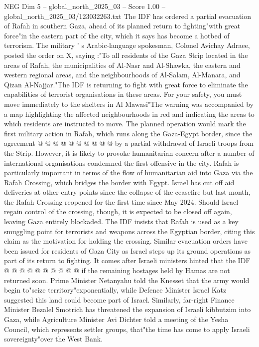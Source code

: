 \begin{textsample}{NEG Dim 5 – global\_north\_2025\_03 – Score 1.00 – global\_north\_2025\_03/123032263.txt}  \label{ex:f5_neg_297}
The IDF has ordered a partial evacuation of Rafah in southern Gaza, ahead of its planned return to fighting"with great force"in the eastern part of the city, which it says has become a hotbed of terrorism.
The military ' s Arabic-language spokesman, Colonel Avichay Adraee, posted the order on X, saying :"To all residents of the Gaza Strip located in the areas of Rafah, the municipalities of Al-Nasr and Al-Shawka, the eastern and western regional areas, and the neighbourhoods of Al-Salam, Al-Manara, and Qizan Al-Najjar."The IDF is returning to fight with great force to eliminate the capabilities of terrorist organisations in these areas.
For your safety, you must move immediately to the shelters in Al Mawasi"The warning was accompanied by a map highlighting the affected neighbourhoods in red and indicating the areas to which residents are instructed to move.
The planned operation would mark the first military action in Rafah, which runs along the Gaza-Egypt border, since the agreement @ @ @ @ @ @ @ @ @ @ by a partial withdrawal of Israeli troops from the Strip.
However, it is likely to provoke humanitarian concern after a number of international organisations condemned the first offensive in the city.
Rafah is particularly important in terms of the flow of humanitarian aid into Gaza via the Rafah Crossing, which bridges the border with Egypt.
Israel has cut off aid deliveries at other entry points since the collapse of the ceasefire but last month, the Rafah Crossing reopened for the first time since May 2024.
Should Israel regain control of the crossing, though, it is expected to be closed off again, leaving Gaza entirely blockaded.
The IDF insists that Rafah is used as a key smuggling point for terrorists and weapons across the Egyptian border, citing this claim as the motivation for holding the crossing.
Similar evacuation orders have been issued for residents of Gaza City as Israel steps up its ground operations as part of its return to fighting.
It comes after Israeli ministers hinted that the IDF @ @ @ @ @ @ @ @ @ @ if the remaining hostages held by Hamas are not returned soon.
Prime Minister Netanyahu told the Knesset that the army would begin to"seize territory"exponentially, while Defence Minister Israel Katz suggested this land could become part of Israel.
Similarly, far-right Finance Minister Bezalel Smotrich has threatened the expansion of Israeli kibbutzim into Gaza, while Agriculture Minister Avi Dichter told a meeting of the Yesha Council, which represents settler groups, that"the time has come to apply Israeli sovereignty"over the West Bank.

\end{textsample}

